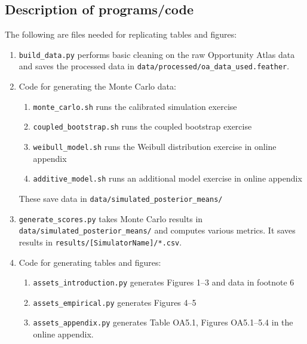 \documentclass[10pt]{article}
\providecommand{\tightlist}{%
  \setlength{\itemsep}{0pt}\setlength{\parskip}{0pt}}
\begin{document}


\hypertarget{description-of-programscode}{%
\subsection{Description of
programs/code}\label{description-of-programscode}}


The following are files needed for replicating tables and figures:
\begin{enumerate}
\item \texttt{build\_data.py} performs basic cleaning on the raw Opportunity Atlas data
and saves the processed data in \texttt{data/processed/oa\_data\_used.feather}. 
  \item Code for generating the Monte Carlo data:
  \begin{enumerate}
  \item \texttt{monte\_carlo.sh} runs the calibrated simulation exercise

\item \texttt{coupled\_bootstrap.sh} runs the coupled bootstrap exercise

\item \texttt{weibull\_model.sh} runs the Weibull distribution exercise in online appendix

\item \texttt{additive\_model.sh} runs an additional model exercise in online appendix
\end{enumerate}
These save data in \texttt{data/simulated\_posterior\_means/}
\item \texttt{generate\_scores.py} takes Monte Carlo results in 
\texttt{data/simulated\_posterior\_means/} and computes various metrics. It saves results
in \texttt{results/[SimulatorName]/*.csv}.
\item Code for generating tables and figures:
\begin{enumerate}
  \item \texttt{assets\_introduction.py} generates Figures 1--3 and data in footnote 6
  \item \texttt{assets\_empirical.py} generates Figures 4--5
  \item \texttt{assets\_appendix.py} generates Table OA5.1, Figures OA5.1--5.4 in the
  online appendix. 
\end{enumerate}
\end{enumerate}
\end{document}

